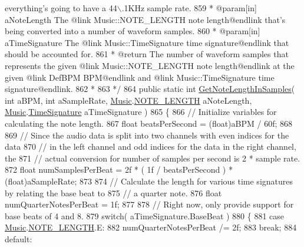 \begin{DoxyCodeInclude}
{       everything's going to have a 44\(\backslash\).1KHz sample rate.}
859 \textcolor{comment}{     * @param[in] aNoteLength The @link Music::NOTE\_LENGTH note length@endlink that's being converted into
       a number of waveform samples.}
860 \textcolor{comment}{     * @param[in] aTimeSignature The @link Music::TimeSignature time signature@endlink that should be
       accounted for.}
861 \textcolor{comment}{     * @return The number of waveform samples that represents the given @link Music::NOTE\_LENGTH note
       length@endlink at the given @link DefBPM BPM@endlink and @link Music::TimeSignature time signature@endlink.}
862 \textcolor{comment}{     * }
863 \textcolor{comment}{    */}
864     \textcolor{keyword}{public} \textcolor{keyword}{static} \textcolor{keywordtype}{int} \hyperlink{group___song_stat_func_ga03712f6defbff25d5a1cd964e4bc3211}{GetNoteLengthInSamples}( \textcolor{keywordtype}{int} aBPM, \textcolor{keywordtype}{int} aSampleRate, 
      \hyperlink{class_music}{Music}.\hyperlink{group___music_enums_gaf11b5f079adbb21c800b9eca1c5c3cbd}{NOTE\_LENGTH} aNoteLength, \hyperlink{class_music}{Music}.\hyperlink{group___music_structs_struct_music_1_1_time_signature}{TimeSignature} aTimeSignature )
865     \{
866         \textcolor{comment}{// Initialize variables for calculating the note length.}
867         \textcolor{keywordtype}{float} beatsPerSecond = (float)aBPM / 60f;
868 
869         \textcolor{comment}{// Since the audio data is split into two channels with even indices for the data }
870         \textcolor{comment}{// in the left channel and odd indices for the data in the right channel, the}
871         \textcolor{comment}{// actual conversion for number of samples per second is 2 * sample rate.}
872         \textcolor{keywordtype}{float} numSamplesPerBeat = 2f * ( 1f / beatsPerSecond ) * (\textcolor{keywordtype}{float})aSampleRate;
873 
874         \textcolor{comment}{// Calculate the length for various time signatures by relating the base beat to }
875         \textcolor{comment}{// a quarter note. }
876         \textcolor{keywordtype}{float} numQuarterNotesPerBeat = 1f;
877 
878         \textcolor{comment}{// Right now, only provide support for base beats of 4 and 8.}
879         \textcolor{keywordflow}{switch}( aTimeSignature.BaseBeat )
880         \{
881             \textcolor{keywordflow}{case} \hyperlink{class_music}{Music}.\hyperlink{group___music_enums_gaf11b5f079adbb21c800b9eca1c5c3cbd}{NOTE\_LENGTH}.E:
882                 numQuarterNotesPerBeat /= 2f;
883                 \textcolor{keywordflow}{break};
884             \textcolor{keywordflow}{default}:

\end{DoxyCodeInclude}
